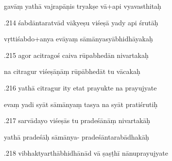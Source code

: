 \documentclass[article,12pt,a4paper]{memoir}%
\newcounter{parCount}
\begin{document}
	  
	  \pstart \leavevmode%
	gavāṃ yathā vajrapāṇis tryakṣe vā+api vyavasthitaḥ 
	{}
	\pend%
      

	  
	  \pstart {}.214 śabdāntaratvād vākyeṣu viśeṣā yady api śrutāḥ 
	{}
	\pend%
      

	  
	  \pstart \leavevmode%
	vṛttiśabdo+anya evāyaṃ sāmānyasyābhidhāyakaḥ 
	{}
	\pend%
      

	  
	  \pstart {}.215 agor acitragoś caiva rūpabhedān nivartakaḥ 
	{}
	\pend%
      

	  
	  \pstart \leavevmode%
	na citragur viśeṣāṇāṃ rūpābhedāt tu vācakaḥ 
	{}
	\pend%
      

	  
	  \pstart {}.216 yathā citragur ity etat prayukte na prayujyate 
	{}
	\pend%
      

	  
	  \pstart \leavevmode%
	evaṃ yadi syāt sāmānyaṃ tasya na syāt pratiśrutiḥ 
	{}
	\pend%
      

	  
	  \pstart {}.217 sarvādayo viśeṣās tu pradeśānāṃ nivartakāḥ 
	{}
	\pend%
      

	  
	  \pstart \leavevmode%
	yathā pradeśāḥ sāmānya- pradeśāntarabādhakāḥ 
	{}
	\pend%
      

	  
	  \pstart {}.218 vibhaktyarthābhidhānād vā ṣaṣṭhī nānuprayujyate 
	{}
	\pend%
      
\end{document}

